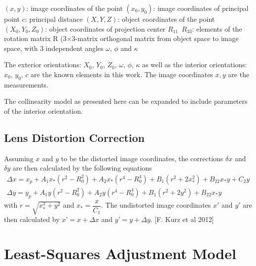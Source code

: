 $(x, y)$: image coordinates of the point \newline
$(x_0, y_0)$: image coordinates of principal point \newline
$c$: principal distance \newline
$(X, Y, Z)$: object coordinates of the point \newline
$(X_0, Y_0, Z_0)$: object coordinates of projection center \newline
$R_{11}$~$R_{33}$: elements of the rotation matrix R (3$\times$3-matrix orthogonal matrix from object space to image space, with 3 independent angles $\omega$, $\phi$ and $\kappa$\newline

The exterior orientations: $X_0$, $Y_0$, $Z_0$, $\omega$, $\phi$, $\kappa$ as well as the interior orientations: $x_0$, $y_0$, $c$ are the known elements in this work. The image coordinates $x,y$ are the measurements.


The collinearity model as presented here can be expanded to include parameters of
the interior orientation.

\subsection{Lens Distortion Correction}

Assuming $x$ and $y$ to be the distorted image coordinates, the corrections $\delta x$ and $\delta y$ are then calculated by the following equations
\begin{equation} \label{eq:2.2}
\begin{aligned}
\Delta x = x_p + A_1x_*(r^2-R_0^2) + A_2x_*(r^4-R_0^4) + B_1(r^2+2x_*^2) + B_22x_*y+C_2y \\
\Delta y = y_p + A_1y  (r^2-R_0^2) + A_2y  (r^4-R_0^4) + B_1(r^2+2y^2)   + B_22x_*y
\end{aligned}
\end{equation}
with $r=\sqrt{x_*^2+y^2}$ and $x_*=\dfrac{x}{C_1}$. The undistorted image coordinates $x\prime$ and $y\prime$ are then calculated by $x’=x+\Delta x$ and $y’=y+\Delta y$. [F. Kurz et al 2012] 



\section{Least-Squares Adjustment Model}
\label{sec:2.4}





\section{}



\section{}


